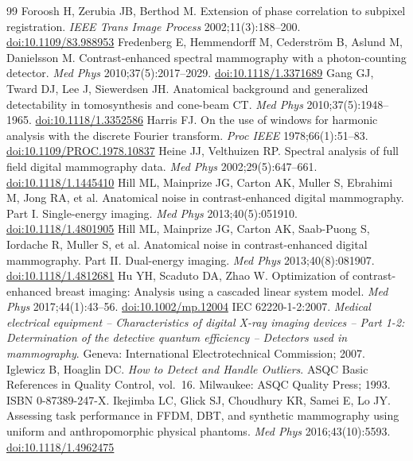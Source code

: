 \documentclass[11pt,a4paper]{article}
\begin{document}
\begin{thebibliography}{99}
 Foroosh H, Zerubia JB, Berthod M. Extension of phase correlation to subpixel registration. \emph{IEEE Trans Image Process} 2002;11(3):188--200. \href{https://doi.org/10.1109/83.988953}{doi:10.1109/83.988953}
 Fredenberg E, Hemmendorff M, Cederström B, Aslund M, Danielsson M. Contrast-enhanced spectral mammography with a photon-counting detector. \emph{Med Phys} 2010;37(5):2017--2029. \href{https://doi.org/10.1118/1.3371689}{doi:10.1118/1.3371689}
 Gang GJ, Tward DJ, Lee J, Siewerdsen JH. Anatomical background and generalized detectability in tomosynthesis and cone-beam CT. \emph{Med Phys} 2010;37(5):1948--1965. \href{https://doi.org/10.1118/1.3352586}{doi:10.1118/1.3352586}
 Harris FJ. On the use of windows for harmonic analysis with the discrete Fourier transform. \emph{Proc IEEE} 1978;66(1):51--83. \href{https://doi.org/10.1109/PROC.1978.10837}{doi:10.1109/PROC.1978.10837}
 Heine JJ, Velthuizen RP. Spectral analysis of full field digital mammography data. \emph{Med Phys} 2002;29(5):647--661. \href{https://doi.org/10.1118/1.1445410}{doi:10.1118/1.1445410}
 Hill ML, Mainprize JG, Carton AK, Muller S, Ebrahimi M, Jong RA, et al. Anatomical noise in contrast-enhanced digital mammography. Part I. Single-energy imaging. \emph{Med Phys} 2013;40(5):051910. \href{https://doi.org/10.1118/1.4801905}{doi:10.1118/1.4801905}
 Hill ML, Mainprize JG, Carton AK, Saab-Puong S, Iordache R, Muller S, et al. Anatomical noise in contrast-enhanced digital mammography. Part II. Dual-energy imaging. \emph{Med Phys} 2013;40(8):081907. \href{https://doi.org/10.1118/1.4812681}{doi:10.1118/1.4812681}
 Hu YH, Scaduto DA, Zhao W. Optimization of contrast-enhanced breast imaging: Analysis using a cascaded linear system model. \emph{Med Phys} 2017;44(1):43--56. \href{https://doi.org/10.1002/mp.12004}{doi:10.1002/mp.12004}
 IEC 62220-1-2:2007. \emph{Medical electrical equipment -- Characteristics of digital X-ray imaging devices -- Part 1-2: Determination of the detective quantum efficiency -- Detectors used in mammography}. Geneva: International Electrotechnical Commission; 2007.
 Iglewicz B, Hoaglin DC. \emph{How to Detect and Handle Outliers}. ASQC Basic References in Quality Control, vol.~16. Milwaukee: ASQC Quality Press; 1993. ISBN 0-87389-247-X.
 Ikejimba LC, Glick SJ, Choudhury KR, Samei E, Lo JY. Assessing task performance in FFDM, DBT, and synthetic mammography using uniform and anthropomorphic physical phantoms. \emph{Med Phys} 2016;43(10):5593. \href{https://doi.org/10.1118/1.4962475}{doi:10.1118/1.4962475}

\end{thebibliography}
\end{document}
